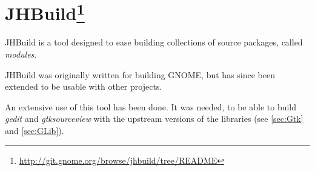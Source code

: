 
\section[JHBuild]{JHBuild\footnote{\url{http://git.gnome.org/browse/jhbuild/tree/README}}}\label{sec:jhbuild}

JHBuild is a tool designed to ease building collections of source packages, called \emph{modules}.

JHBuild was originally written for building GNOME, but has since been extended to be usable with other projects.

An extensive use of this tool has been done. It was needed, to be able to build \emph{gedit} and \emph{gtksourceview} with the upstream versions of the libraries (see \ref{sec:Gtk} and \ref{sec:GLib}).
